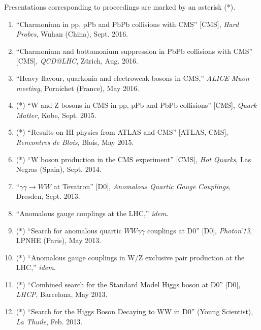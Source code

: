 \documentclass[a4paper,11pt]{article}
\begin{document}
 Presentations corresponding to proceedings are marked by an asterisk (*).
 
 \begin{enumerate}
 \item ``Charmonium in pp, pPb and PbPb collisions with CMS'' [CMS], \emph{Hard Probes}, Wuhan (China), Sept. 2016.
 \item ``Charmonium and bottomonium suppression in PbPb collisions with CMS'' [CMS], \emph{QCD@LHC}, Zürich, Aug. 2016.
 \item ``Heavy flavour, quarkonia and electroweak bosons in CMS,'' \emph{ALICE Muon meeting}, Pornichet (France), May 2016.
 \item (*) ``W and Z bosons in CMS in pp, pPb and PbPb collisions'' [CMS], \emph{Quark Matter}, Kobe, Sept. 2015.
 \item (*) ``Results on HI physics from ATLAS and CMS'' [ATLAS, CMS], \emph{Rencontres de Blois}, Blois, May 2015.
\item (*) ``W boson production in the CMS experiment'' [CMS], \emph{Hot Quarks}, Las Negras (Spain), Sept.  
2014.
\item ``$\gamma\gamma \to WW$ at Tevatron'' [D0], \emph{Anomalous Quartic 
Gauge Couplings}, Dresden, Sept. 2013.
 \item ``Anomalous gauge couplings 
 at the LHC,'' 
\emph{idem}.%
 \item (*) ``Search for anomalous quartic $WW\gamma\gamma$ couplings at 
D0'' [D0], \emph{Photon'13}, LPNHE (Paris), May 2013.
 \item (*) ``Anomalous gauge couplings in W/Z exclusive pair production at the LHC,'' 
 \emph{idem}.
 \item (*) ``Combined search for the Standard Model Higgs boson at D0'' [D0], 
\emph{LHCP}, Barcelona, May 2013.
 \item (*) ``Search for the Higgs Boson Decaying to WW in D0'' (Young Scientist), 
\emph{La Thuile}, Feb. 2013.

\end{enumerate}
\end{document}
